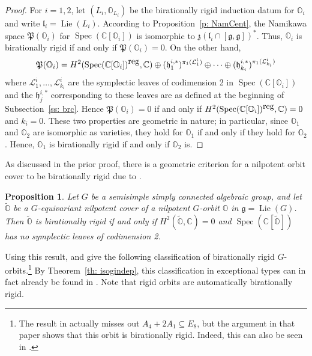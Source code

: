 \documentclass[11pt]{amsart}
\newcommand{\C}{{\mathbb C}}
\renewcommand{\O}{{\mathbb O}}
\newcommand{\g}{{\mathfrak g}}
\newcommand{\h}{{\mathfrak h}}
\renewcommand{\l}{{\mathfrak l}}
\renewcommand{\P}{{\mathfrak P}}
\newcommand{\z}{{\mathfrak z}}
\newcommand{\cL}{{\mathcal L}}
\newcommand{\Lie}{\operatorname{Lie}}
\newcommand{\Spec}{\operatorname{Spec}}
\newcommand{\reg}{{{\mbox{\rm reg}}}}
\newcommand{\covO}{\widetilde{\O}}
\newtheorem{prop}[theorem]{Proposition}
\numberwithin{equation}{section}
\begin{document}
	\begin{proof}
		For $i=1,2$, let $(L_i,\O_{L_i})$ be the birationally rigid induction datum for $\O_i$ and write $\l_i=\Lie(L_i)$. According to Proposition~\ref{p: NamCent}, the Namikawa space $\P(\O_i)$ for $\Spec(\C[\O_i])$ is isomorphic to $\z(\l_i\cap[\g,\g])^{*}$. Thus, $\O_i$ is birationally rigid if and only if $\P(\O_i)=0$. On the other hand, $$\P(\O_i)=H^2(\Spec(\C[\O_i])^{\tiny \reg},\C)\oplus (\h_1^{i,*})^{\pi_1(\cL_1^i)}\oplus \cdots \oplus (\h_{k_i}^{i,*})^{\pi_1(\cL_{k_i}^i)} $$ where $\cL_1^i,\ldots,\cL_{k_i}^i$ are the symplectic leaves of codimension 2 in $\Spec(\C[\O_i])$ and the $\h_j^{i,*}$ corresponding to these leaves are as defined at the beginning of Subsection~\ref{ss: brc}. Hence $\P(\O_i)=0$ if and only if $H^2(\Spec(\C[\O_i])^{\tiny \reg},\C)=0$ and $k_i=0$. These two properties are geometric in nature; in particular, since $\O_1$ and $\O_2$ are isomorphic as varieties, they hold for $\O_1$ if and only if they hold for $\O_2$. Hence, $\O_1$ is birationally rigid if and only if $\O_2$ is.
		
	\end{proof}
	
	As discussed in the prior proof, there is a geometric criterion for a nilpotent orbit cover to be birationally rigid due to \cite[Corollary 7.6.1]{LMM}.
	\begin{prop}
		Let $G$ be a semisimple simply connected algebraic group, and let $\covO$ be a $G$-equivariant nilpotent cover of a nilpotent $G$-orbit $\O$ in $\g=\Lie(G)$. Then $\covO$ is birationally rigid if and only if $H^2(\covO,\C)=0$ and $\Spec(\C[\covO])$ has no symplectic leaves of codimension 2.
	\end{prop}
	
	Using this result, \cite[Proposition 7.6.3]{LMM} and \cite[Proposition 3.8.3]{MM} give the following classification of birationally rigid $G$-orbits.\footnote{The result in \cite{MM} actually misses out $A_4+2A_1\subseteq E_8$, but the argument in that paper shows that this orbit is birationally rigid. Indeed, this can also be seen in \cite{Fu}.} By Theorem~\ref{th: isogindep}, this classification in exceptional types can in fact already be found in \cite{Fu}. Note that rigid orbits are automatically birationally rigid.
	
\end{document}
